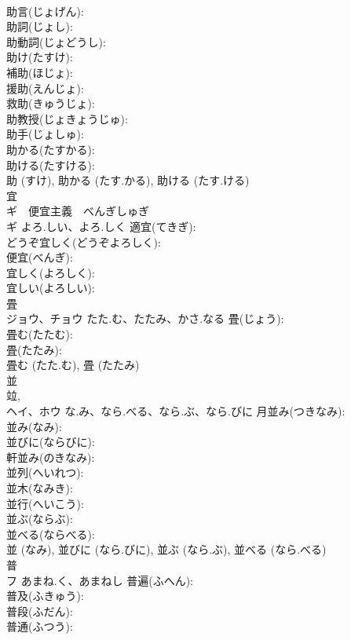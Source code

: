 \documentclass[8pt]{extreport}
\begin{document}
\begin{CJK}{UTF8}{min}
\\	助言(じょげん): 
\\	助詞(じょし): 
\\	助動詞(じょどうし): 
\\	助け(たすけ): 
\\	補助(ほじょ): 
\\	援助(えんじょ): 
\\	救助(きゅうじょ): 
\\	助教授(じょきょうじゅ): 
\\	助手(じょしゅ): 
\\	助かる(たすかる): 
\\	助ける(たすける): 
\\	助 (すけ), 助かる (たす.かる), 助ける (たす.ける)
\\	宜			
\\	ギ　便宜主義　べんぎしゅぎ
\\	ギ	よろ.しい、よろ.しく	適宜(てきぎ): 
\\	どうぞ宜しく(どうぞよろしく): 
\\	便宜(べんぎ): 
\\	宜しく(よろしく): 
\\	宜しい(よろしい): 
\\	畳			
\\	ジョウ、チョウ	たた.む、たたみ、かさ.なる	畳(じょう): 
\\	畳む(たたむ): 
\\	畳(たたみ): 
\\	畳む (たた.む), 畳 (たたみ)
\\	並			
\\	竝, 
\\	ヘイ、ホウ	な.み、なら.べる、なら.ぶ、なら.びに	月並み(つきなみ): 
\\	並み(なみ): 
\\	並びに(ならびに): 
\\	軒並み(のきなみ): 
\\	並列(へいれつ): 
\\	並木(なみき): 
\\	並行(へいこう): 
\\	並ぶ(ならぶ): 
\\	並べる(ならべる): 
\\	並 (なみ), 並びに (なら.びに), 並ぶ (なら.ぶ), 並べる (なら.べる)
\\	普			
\\	フ	あまね.く、あまねし	普遍(ふへん): 
\\	普及(ふきゅう): 
\\	普段(ふだん): 
\\	普通(ふつう): 

\end{CJK}
\end{document}
